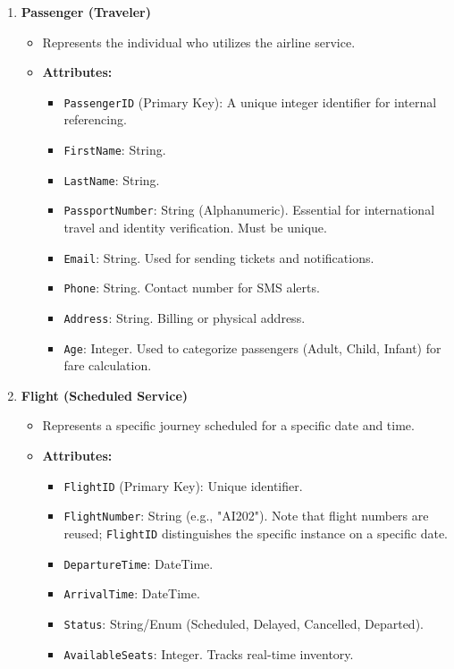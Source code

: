 \documentclass[12pt, a4paper]{article}
\begin{document}
	\begin{enumerate}
		\item \textbf{Passenger (Traveler)}
		\begin{itemize}
			\item Represents the individual who utilizes the airline service.
			\item \textbf{Attributes:}
			\begin{itemize}
				\item \texttt{PassengerID} (Primary Key): A unique integer identifier for internal referencing.
				\item \texttt{FirstName}: String.
				\item \texttt{LastName}: String.
				\item \texttt{PassportNumber}: String (Alphanumeric). Essential for international travel and identity verification. Must be unique.
				\item \texttt{Email}: String. Used for sending tickets and notifications.
				\item \texttt{Phone}: String. Contact number for SMS alerts.
				\item \texttt{Address}: String. Billing or physical address.
				\item \texttt{Age}: Integer. Used to categorize passengers (Adult, Child, Infant) for fare calculation.
			\end{itemize}
		\end{itemize}
		
		\item \textbf{Flight (Scheduled Service)}
		\begin{itemize}
			\item Represents a specific journey scheduled for a specific date and time.
			\item \textbf{Attributes:}
			\begin{itemize}
				\item \texttt{FlightID} (Primary Key): Unique identifier.
				\item \texttt{FlightNumber}: String (e.g., "AI202"). Note that flight numbers are reused; \texttt{FlightID} distinguishes the specific instance on a specific date.
				\item \texttt{DepartureTime}: DateTime.
				\item \texttt{ArrivalTime}: DateTime.
				\item \texttt{Status}: String/Enum (Scheduled, Delayed, Cancelled, Departed).
				\item \texttt{AvailableSeats}: Integer. Tracks real-time inventory.
			\end{itemize}
		\end{itemize}
		

\end{enumerate}
\end{document}
